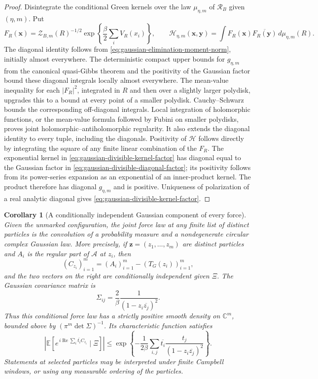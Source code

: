 \documentclass[11pt,a4paper]{article}
\numberwithin{equation}{section}
\newtheorem{corollary}[theorem]{Corollary}
\theoremstyle{definition}
\theoremstyle{remark}
\newcommand{\C}{\mathbb C}
\begin{document}
\begin{proof}
Disintegrate the conditional Green kernels over the law
$\mu_{\eta,m}$ of $\mathcal R_B$ given $(\eta,m)$. Put
\[
 F_R(\mathbf x)=\mathcal Z_{B,m}(R)^{-1/2}
             \exp\left\{\frac\beta2\sum_iV_R(x_i)\right\},\qquad
 \mathcal H_{\eta,m}(\mathbf x,\mathbf y)
      =\int F_R(\mathbf x)\overline{F_R(\mathbf y)}
                                                \,d\mu_{\eta,m}(R).
\]
The diagonal identity follows from
\eqref{eq:gaussian-elimination-moment-norm}, initially almost everywhere.
The deterministic compact upper bounds for $g_{\eta,m}$ from the
canonical quasi-Gibbs theorem and the positivity of the Gaussian factor
bound these diagonal integrals locally almost everywhere. The
mean-value inequality for each $|F_R|^2$, integrated in $R$ and then
over a slightly larger polydisk, upgrades this to a bound at every
point of a smaller polydisk. Cauchy--Schwarz bounds the
corresponding off-diagonal integrals. Local integration of holomorphic
functions, or the mean-value formula followed by Fubini on smaller
polydisks, proves joint holomorphic--antiholomorphic regularity. It also
extends the diagonal identity to every tuple, including the diagonals.
Positivity of $\mathcal H$ follows directly by integrating the square
of any finite linear combination of the $F_R$. The exponential kernel
in \eqref{eq:gaussian-divisible-kernel-factor} has diagonal equal to the
Gaussian factor in \eqref{eq:gaussian-divisible-diagonal-factor}; its
positivity follows from its power-series expansion as an exponential
of an inner-product kernel. The product therefore has diagonal
$g_{\eta,m}$ and is positive. Uniqueness of polarization of a real
analytic diagonal gives \eqref{eq:gaussian-divisible-kernel-factor}.
\end{proof}

\begin{corollary}[A conditionally independent Gaussian component of every force]
\label{cor:conditional-force-gaussian-convolution}
Given the unmarked configuration, the joint force law at any finite
list of distinct particles is the convolution of a probability measure
and a nondegenerate circular complex Gaussian law. More precisely, if
$\mathbf z=(z_1,\ldots,z_m)$ are distinct particles and
$A_i$ is the regular part of $\mathcal A$ at $z_i$, then
\[
 (C_{z_i})_{i=1}^m=(A_i)_{i=1}^m-(T_G(z_i))_{i=1}^m,
\]
and the two vectors on the right are conditionally independent given
$\Xi$. The Gaussian covariance matrix is
\[
 \Sigma_{ij}=\frac2\beta\frac1{(1-z_i\overline{z_j})^2}.
\]
Thus this conditional force law has a strictly positive smooth density
on $\C^m$, bounded above by $(\pi^m\det\Sigma)^{-1}$. Its
characteristic function satisfies
\[
 \left|\mathbb E\left[
  e^{\,i\operatorname{Re}\sum_i\overline{t_i}C_{z_i}}\mid\Xi\right]\right|
 \le \exp\left\{-\frac1{2\beta}
           \sum_{i,j}\overline{t_i}
                     \frac{t_j}{(1-z_i\overline{z_j})^2}\right\}.
\]
Statements at selected particles may be interpreted under finite
Campbell windows, or using any measurable ordering of the particles.
\end{corollary}
\end{document}
